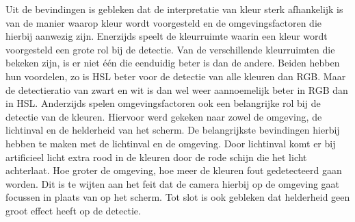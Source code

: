  
Uit de bevindingen is gebleken dat de interpretatie van kleur sterk afhankelijk is van de manier waarop kleur wordt voorgesteld en de omgevingsfactoren die hierbij aanwezig zijn. Enerzijds speelt de kleurruimte waarin een kleur wordt voorgesteld een grote rol bij de detectie. Van de verschillende kleurruimten die bekeken zijn, is er niet één die eenduidig beter is dan de andere. Beiden hebben hun voordelen, zo is HSL beter voor de detectie van alle kleuren dan RGB. Maar de detectieratio van zwart en wit is dan wel weer aannoemelijk beter in RGB dan in HSL.  Anderzijds spelen omgevingsfactoren ook een belangrijke rol bij de detectie van de kleuren. Hiervoor werd gekeken naar zowel de omgeving, de lichtinval en de helderheid van het scherm. De belangrijkste bevindingen hierbij hebben te maken met de lichtinval en de omgeving. Door lichtinval komt er bij artificieel licht extra rood in de kleuren door de rode schijn die het licht achterlaat. Hoe groter de omgeving, hoe meer de kleuren fout gedetecteerd gaan worden. Dit is te wijten aan het feit dat de camera hierbij op de omgeving gaat focussen in plaats van op het scherm. Tot slot is ook gebleken dat helderheid geen groot effect heeft op de detectie.
